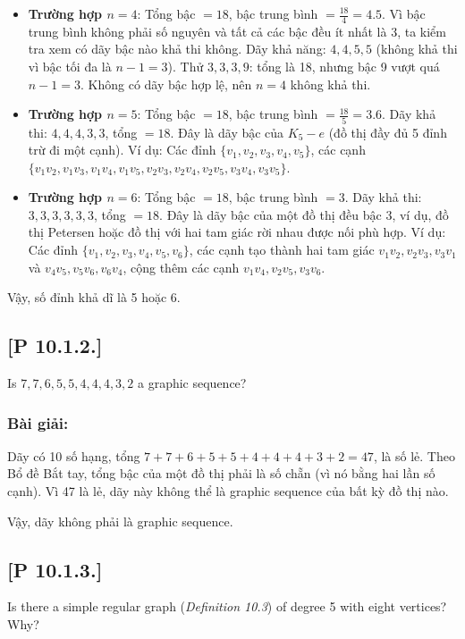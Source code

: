 \documentclass[a4paper,12pt]{article}
\begin{document}
\begin{itemize}
    \item \textbf{Trường hợp \( n = 4 \)}: Tổng bậc \( = 18 \), bậc trung bình \( = \frac{18}{4} = 4.5 \). Vì bậc trung bình không phải số nguyên và tất cả các bậc đều ít nhất là 3, ta kiểm tra xem có dãy bậc nào khả thi không. Dãy khả năng: \( 4, 4, 5, 5 \) (không khả thi vì bậc tối đa là \( n-1 = 3 \)). Thử \( 3, 3, 3, 9 \): tổng là 18, nhưng bậc 9 vượt quá \( n-1 = 3 \). Không có dãy bậc hợp lệ, nên \( n = 4 \) không khả thi.
    \item \textbf{Trường hợp \( n = 5 \)}: Tổng bậc \( = 18 \), bậc trung bình \( = \frac{18}{5} = 3.6 \). Dãy khả thi: \( 4, 4, 4, 3, 3 \), tổng \( = 18 \). Đây là dãy bậc của \( K_5 - e \) (đồ thị đầy đủ 5 đỉnh trừ đi một cạnh). Ví dụ: Các đỉnh \( \{v_1, v_2, v_3, v_4, v_5\} \), các cạnh \( \{v_1v_2, v_1v_3, v_1v_4, v_1v_5, v_2v_3, v_2v_4, v_2v_5, v_3v_4, v_3v_5\} \).
    \item \textbf{Trường hợp \( n = 6 \)}: Tổng bậc \( = 18 \), bậc trung bình \( = 3 \). Dãy khả thi: \( 3, 3, 3, 3, 3, 3 \), tổng \( = 18 \). Đây là dãy bậc của một đồ thị đều bậc 3, ví dụ, đồ thị Petersen hoặc đồ thị với hai tam giác rời nhau được nối phù hợp. Ví dụ: Các đỉnh \( \{v_1, v_2, v_3, v_4, v_5, v_6\} \), các cạnh tạo thành hai tam giác \( v_1v_2, v_2v_3, v_3v_1 \) và \( v_4v_5, v_5v_6, v_6v_4 \), cộng thêm các cạnh \( v_1v_4, v_2v_5, v_3v_6 \).
\end{itemize}

Vậy, số đỉnh khả dĩ là 5 hoặc 6.

\subsection*{[P 10.1.2.]} Is $7, 7, 6, 5, 5, 4, 4, 4, 3, 2$ a graphic sequence?

\subsubsection*{Bài giải:}
Dãy có 10 số hạng, tổng \( 7 + 7 + 6 + 5 + 5 + 4 + 4 + 4 + 3 + 2 = 47 \), là số lẻ. Theo Bổ đề Bắt tay, tổng bậc của một đồ thị phải là số chẵn (vì nó bằng hai lần số cạnh). Vì 47 là lẻ, dãy này không thể là graphic sequence của bất kỳ đồ thị nào.

Vậy, dãy không phải là graphic sequence.

\subsection*{[P 10.1.3.]} Is there a simple regular graph (\textit{Definition 10.3}) of degree 5 with eight vertices? Why?
\end{document}
